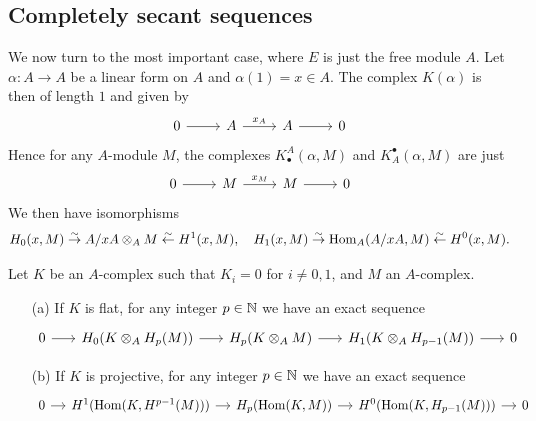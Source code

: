 \subsection{Completely secant sequences}
We now turn to the most important case, where $E$ is just the free module $A$. Let $\alpha:A\to A$ be a linear form on $A$ and $\alpha(1)=x\in A$. The complex $K(\alpha)$ is then of length $1$ and given by
\[\begin{tikzcd}
0\ar[r]&A\ar[r,"x_A"]&A\ar[r]&0
\end{tikzcd}\]
Hence for any $A$-module $M$, the complexes $K_\bullet^A(\alpha,M)$ and $K^\bullet_A(\alpha,M)$ are just
\[\begin{tikzcd}
0\ar[r]&M\ar[r,"x_M"]&M\ar[r]&0
\end{tikzcd}\]
We then have isomorphisms
\[H_0(x,M)\stackrel{\sim}{\to} A/xA\otimes_AM\stackrel{\sim}{\leftarrow} H^1(x,M),\quad H_1(x,M)\stackrel{\sim}{\to}\mathrm{Hom}_A(A/xA,M)\stackrel{\sim}{\leftarrow} H^0(x,M).\]
\begin{lemma}\label{module complex tensoring and Hom with homology lemma}
Let $K$ be an $A$-complex such that $K_i=0$ for $i\neq 0,1$, and $M$ an $A$-complex.
\begin{itemize}
\item[(a)] If $K$ is flat, for any integer $p\in\mathbb{N}$ we have an exact sequence
\[\begin{tikzcd}[column sep=6mm]
0\ar[r]&H_0(K\otimes_AH_p(M))\ar[r]&H_p(K\otimes_AM)\ar[r]&H_1(K\otimes_AH_{p-1}(M))\ar[r]&0
\end{tikzcd}\] 
\item[(b)] If $K$ is projective, for any integer $p\in\mathbb{N}$ we have an exact sequence
\[\begin{tikzcd}[column sep=4mm]
0\ar[r]&H^1(\Hom(K,H^{p-1}(M)))\ar[r]&H_p(\Hom(K,M))\ar[r]&H^0(\Hom(K,H_{p-1}(M)))\ar[r]&0
\end{tikzcd}\] 
\end{itemize}
\end{lemma}
